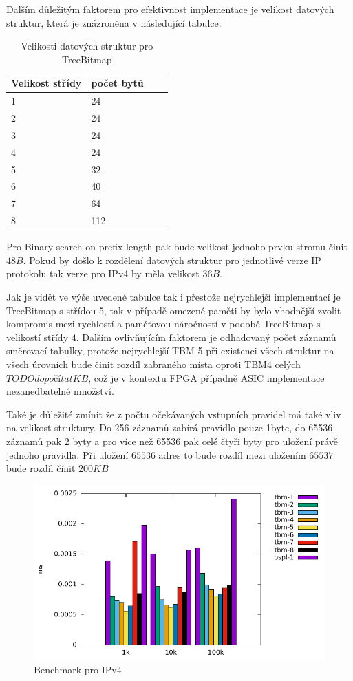 Dalším důležitým faktorem pro efektivnost implementace je velikost datových struktur, která je znázroněna v následující tabulce.

\begin{table}[!htb]
	\center
	\label{tab:lpm-input}
	\caption{Velikosti datových struktur pro TreeBitmap}
    \begin{tabular}{|l|l|l|l|}
    \hline
    Velikost střídy & počet bytů \\ \hline
    1 & 24 \\ \hline
    2 & 24 \\ \hline
    3 & 24 \\ \hline
    4 & 24 \\ \hline
    5 & 32 \\ \hline
    6 & 40 \\ \hline
    7 & 64 \\ \hline
    8 & 112 \\ \hline
    \end{tabular}
\end{table}

Pro Binary search on prefix length pak bude velikost jednoho prvku stromu činit $48B$.
Pokud by došlo k rozdělení datových struktur pro jednotlivé verze IP protokolu
tak verze pro IPv4 by měla velikost $36B$.

Jak je vidět ve výše uvedené tabulce tak i přestože nejrychlejší implementací je TreeBitmap s střídou 5,
tak v případě omezené paměti by bylo vhodnější zvolit kompromis mezi rychlostí a paměťovou náročností v podobě
TreeBitmap s velikostí střídy 4. Dalším ovlivňujícím faktorem je odhadovaný počet záznamů směrovací tabulky, protože
nejrychlejší TBM-5 při existenci všech struktur na všech úrovních bude činit rozdíl zabraného místa oproti TBM4
celých $TODO dopočítat KB$, což je v kontextu FPGA případně ASIC implementace nezanedbatelné množství.

Také je důležité zmínit že z počtu očekávaných vstupních pravidel má také vliv na velikost struktury.
Do 256 záznamů zabírá pravidlo pouze 1byte, do 65536 záznamů pak 2 byty a pro více než 65536 pak celé čtyři byty pro uložení právě jednoho pravidla. Při uložení $65536$ adres to bude rozdíl mezi uložením $65537$ bude rozdíl činit
$200KB$

\begin{figure}[!htb]
	\centering
	\includegraphics[scale=1]{fig/lpm-ipv4.pdf}
	\caption{Benchmark pro IPv4}
\end{figure}\label{fig:lpm-ipv4}

